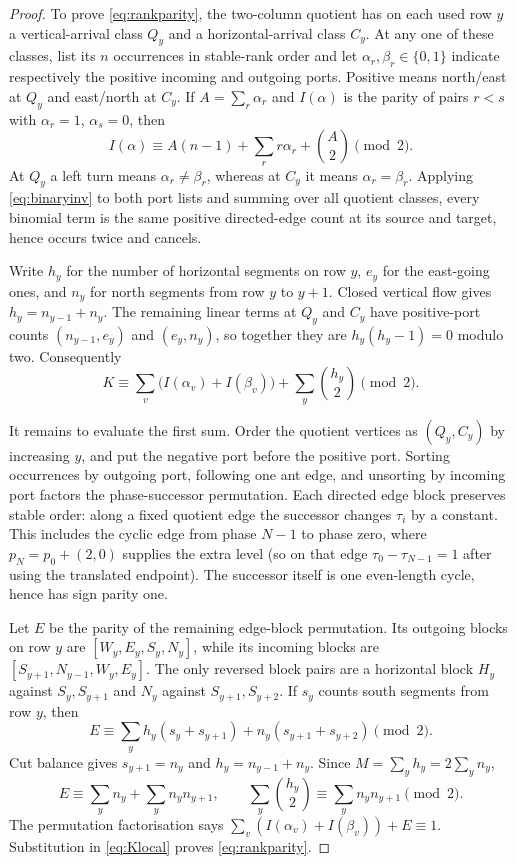 \documentclass[11pt,letterpaper]{article}
\theoremstyle{plain}
\theoremstyle{definition}
\begin{document}
\begin{NoHyper}
\begin{proof}
To prove \eqref{eq:rankparity}, the two-column quotient has on each used row $y$ a
vertical-arrival class $Q_y$ and a horizontal-arrival class $C_y$.  At any one of
these classes, list its $n$ occurrences in stable-rank order and let
$\alpha_r,\beta_r\in\{0,1\}$ indicate respectively the positive incoming and
outgoing ports.  Positive means north/east at $Q_y$ and east/north at $C_y$.  If
$A=\sum_r\alpha_r$ and $I(\alpha)$ is the parity of pairs $r<s$ with
$\alpha_r=1$, $\alpha_s=0$, then
\begin{equation}\label{eq:binaryinv}
I(\alpha)\equiv A(n-1)+\sum_r r\alpha_r+\binom A2\pmod2.
\end{equation}
At $Q_y$ a left turn means $\alpha_r\ne\beta_r$, whereas at $C_y$ it means
$\alpha_r=\beta_r$.  Applying \eqref{eq:binaryinv} to both port lists and summing over
all quotient classes, every binomial term is the same positive directed-edge count
at its source and target, hence occurs twice and cancels.

Write $h_y$ for the number of horizontal segments on row $y$, $e_y$ for the
east-going ones, and $n_y$ for north segments from row $y$ to $y+1$.  Closed
vertical flow gives $h_y=n_{y-1}+n_y$.  The remaining linear terms at $Q_y$ and
$C_y$ have positive-port counts $(n_{y-1},e_y)$ and $(e_y,n_y)$, so together they
are $h_y(h_y-1)=0$ modulo two.  Consequently
\begin{equation}\label{eq:Klocal}
K\equiv\sum_v\bigl(I(\alpha_v)+I(\beta_v)\bigr)
       +\sum_y\binom{h_y}{2}\pmod2.
\end{equation}

It remains to evaluate the first sum.  Order the quotient vertices as
$(Q_y,C_y)$ by increasing $y$, and put the negative port before the positive port.
Sorting occurrences by outgoing port, following one ant edge, and unsorting by
incoming port factors the phase-successor permutation.  Each directed edge block
preserves stable order: along a fixed quotient edge the successor changes $\tau_i$
by a constant.  This includes the cyclic edge from phase $N-1$ to phase zero, where
$p_N=p_0+(2,0)$ supplies the extra level (so on that edge
$\tau_0-\tau_{N-1}=1$ after using the translated endpoint).  The successor itself is one even-length
cycle, hence has sign parity one.

Let $E$ be the parity of the remaining edge-block permutation.  Its outgoing blocks
on row $y$ are $[W_y,E_y,S_y,N_y]$, while its incoming blocks are
$[S_{y+1},N_{y-1},W_y,E_y]$.  The only reversed block pairs are a horizontal block
$H_y$ against $S_y,S_{y+1}$ and $N_y$ against $S_{y+1},S_{y+2}$.  If $s_y$ counts
south segments from row $y$, then
\[
E\equiv\sum_y h_y(s_y+s_{y+1})+n_y(s_{y+1}+s_{y+2})\pmod2.
\]
Cut balance gives $s_{y+1}=n_y$ and $h_y=n_{y-1}+n_y$.  Since
$M=\sum_yh_y=2\sum_yn_y$,
\[
E\equiv\sum_yn_y+\sum_yn_yn_{y+1},\qquad
\sum_y\binom{h_y}{2}\equiv\sum_yn_yn_{y+1}\pmod2.
\]
The permutation factorisation says
$\sum_v(I(\alpha_v)+I(\beta_v))+E\equiv1$.  Substitution in
\eqref{eq:Klocal} proves \eqref{eq:rankparity}.


\end{proof}
\end{NoHyper}
\end{document}

